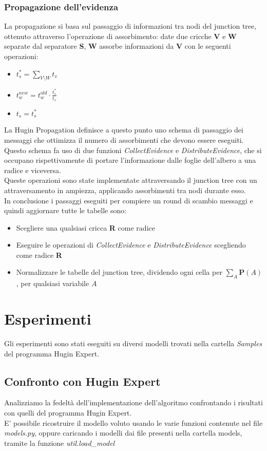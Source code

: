 \documentclass[a4paper]{article}
\begin{document}
\subsubsection{Propagazione dell'evidenza}
La propagazione si basa sul passaggio di informazioni tra nodi del junction tree, ottenuto attraverso l'operazione di assorbimento: date due cricche \textbf{V} e \textbf{W} separate dal separatore \textbf{S}, \textbf{W} assorbe informazioni da \textbf{V} con le seguenti operazioni:
\begin{itemize}
\item $t_s^* = \sum_{V\setminus W}t_v$
\item $t_w^{new}=t_w^{old}\cdot\frac{t_s^*}{t_s}$
\item $t_s = t_s^*$
\end{itemize} 
La Hugin Propagation definisce a questo punto uno schema di passaggio dei messaggi che ottimizza il numero di assorbimenti che devono essere eseguiti. Questo schema fa uso di due funzioni \emph{CollectEvidence} e \emph{DistributeEvidence}, che si occupano rispettivamente di portare l'informazione dalle foglie dell'albero a una radice e viceversa.\\
Queste operazioni sono state implementate attraversando il junction tree con un attraversamento in ampiezza, applicando assorbimenti tra nodi durante esso.\\
In conclusione i passaggi eseguiti per compiere un round di scambio messaggi e quindi aggiornare tutte le tabelle sono:
\begin{itemize}
\item Scegliere una qualsiasi cricca \textbf{R} come radice
\item Eseguire le operazioni di \emph{CollectEvidence} e \emph{DistributeEvidence} scegliendo come radice \textbf{R}
\item Normalizzare le tabelle del junction tree, dividendo ogni cella per $\sum_A \mathbf{P}(A)$, per qualsiasi variabile $A$
\end{itemize}

\section{Esperimenti}
Gli esperimenti sono stati eseguiti su diversi modelli trovati nella cartella \emph{Samples} del programma Hugin Expert.
\subsection{Confronto con Hugin Expert}
Analizziamo la fedeltà dell'implementazione dell'algoritmo confrontando i risultati con quelli del programma Hugin Expert.\\
E' possibile ricostruire il modello voluto usando le varie funzioni contenute nel file \emph{models.py}, oppure caricando i modelli dai file presenti nella cartella models, tramite la funzione \emph{util.load\_model}
\end{document}

